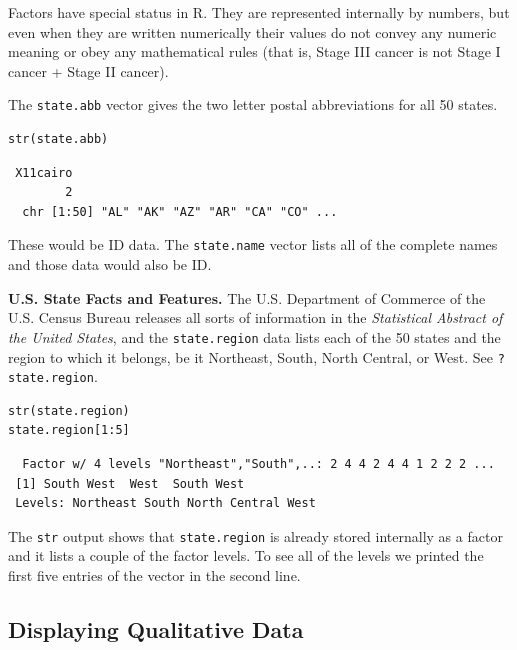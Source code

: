 \documentclass[captions=tableheading]{scrbook}
\begin{document}
Factors have special status in \textsf{R}. They are represented internally by numbers, but even when they are written numerically their values do not convey any numeric meaning or obey any mathematical rules (that is, Stage III cancer is not Stage I cancer + Stage II cancer).

\begin{example}
The \texttt{state.abb}
vector gives the two letter postal abbreviations for all 50 states.


\begin{verbatim}
str(state.abb)
\end{verbatim}

\begin{verbatim}
 X11cairo 
        2
  chr [1:50] "AL" "AK" "AZ" "AR" "CA" "CO" ...
\end{verbatim}

These would be ID data. The \texttt{state.name} vector lists all of the complete names and those data would also be ID.
\end{example}

\begin{example}
\textbf{U.S. State Facts and Features.} The U.S. Department of Commerce of the U.S. Census Bureau releases all sorts of information in the \emph{Statistical Abstract of the United States}, and the \texttt{state.region} data lists each of the 50 states and the region to which it belongs, be it Northeast, South, North Central, or West. See \texttt{?state.region}.


\begin{verbatim}
str(state.region)
state.region[1:5]
\end{verbatim}

\begin{verbatim}
  Factor w/ 4 levels "Northeast","South",..: 2 4 4 2 4 4 1 2 2 2 ...
 [1] South West  West  South West 
 Levels: Northeast South North Central West
\end{verbatim}

The \texttt{str} output shows that \texttt{state.region} is already stored internally as a factor and it lists a couple of the factor levels. To see all of the levels we printed the first five entries of the vector in the second line.
\end{example}
\subsection{Displaying Qualitative Data}
\label{sec-3-1-4}
\end{document}
